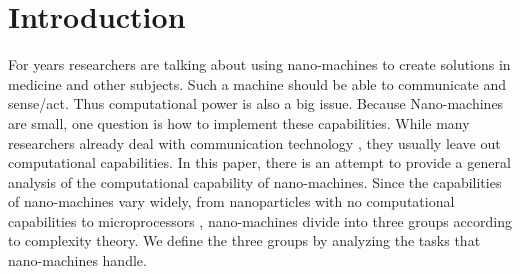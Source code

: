 \documentclass[10pt,sigconf]{acmart}
\begin{document}
\section{Introduction}
For years researchers are talking about using nano-machines to create solutions in medicine and other subjects. Such a machine should be able to communicate and sense/act. Thus computational power is also a big issue.
Because Nano-machines are small, one question is how to implement these capabilities. 
While many researchers already deal with communication technology \cite{akyildiz2008nanonetworks}, they usually leave out computational capabilities.
In this paper, there is an attempt to provide a general analysis of the computational capability of nano-machines.
Since the capabilities of nano-machines vary widely, from nanoparticles with no computational capabilities to microprocessors \cite{cobo2010bacteria}, nano-machines divide into three groups according to complexity theory.
We define the three groups by analyzing the tasks that nano-machines handle.
\end{document}

